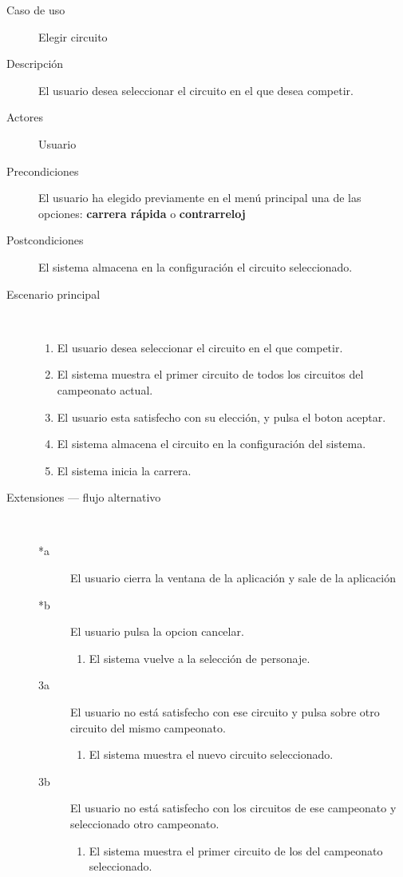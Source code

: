 \begin{description}
    \item[Caso de uso] Elegir circuito
    \item[Descripción] El usuario desea seleccionar el circuito en el que desea competir.
    \item[Actores] Usuario
    \item[Precondiciones] El usuario ha elegido previamente en el menú principal una de las opciones: \textbf{carrera rápida} 
    o \textbf{contrarreloj}
    \item[Postcondiciones] El sistema almacena en la configuración el circuito seleccionado.
    \item[Escenario principal] $\quad$
        \begin{enumerate}
            \item El usuario desea seleccionar el circuito en el que competir.
            \item El sistema muestra el primer circuito de todos los circuitos del campeonato actual.
            \item El usuario esta satisfecho con su elección, y pulsa el boton aceptar.
            \item El sistema almacena el circuito en la configuración del sistema.
            \item El sistema inicia la carrera.
        \end{enumerate}
    \item[Extensiones --- flujo alternativo] $\quad$
        \begin{description}
            \item[*a ] El usuario cierra la ventana de la aplicación y sale de la aplicación
            \item[*b ] El usuario pulsa la opcion cancelar.
            \begin{enumerate}
                \item El sistema vuelve a la selección de personaje.
            \end{enumerate}
            
            \item[3a ] El usuario no está satisfecho con ese circuito y pulsa sobre otro circuito del mismo campeonato.
            \begin{enumerate}
                \item El sistema muestra el nuevo circuito seleccionado.
            \end{enumerate}
            
            \item[3b ] El usuario no está satisfecho con los circuitos de ese campeonato y seleccionado otro campeonato.
            \begin{enumerate}
                \item El sistema muestra el primer circuito de los del campeonato seleccionado.
            \end{enumerate}
        \end{description}
\end{description}

